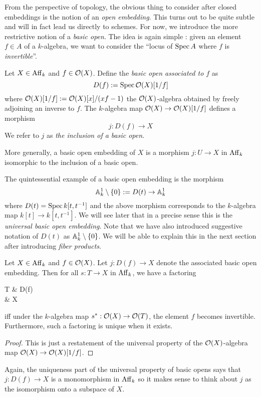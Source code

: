 \documentclass[./main.tex]{subfiles}
\begin{document}
From the perspective of topology,
the obvious thing to consider after closed embeddings
is the notion of an \emph{open embedding}.
This turns out to be quite subtle and
will in fact lead us directly to schemes.
For now, we introduce the more restrictive notion
of a \emph{basic open}.
The idea is again simple : 
given an element $f \in A$ of a $k$-algebra,
we want to consider the ``locus of $\operatorname{Spec} A$ where $f$ is \emph{invertible}''.

\begin{dfn}
  
  Let $X \in \mathrm{Aff}_k$ and $f \in \mathcal{O}(X)$.
  Define the \emph{basic open associated to $f$}
  as \[
    D(f) := \operatorname{Spec} \mathcal{O}(X)[1 / f]
  \] where
  $\mathcal{O}(X)[1 / f] := \mathcal{O}(X)[x] / (x f - 1)$
  the $\mathcal{O}(X)$-algebra obtained by freely adjoining an inverse to $f$.
  The $k$-algebra map $\mathcal{O}(X) \to \mathcal{O}(X)[1 / f]$ defines
  a morphism \[
    j :  D(f) \to X
  \]
  We refer to $j$ as \emph{the inclusion of a basic open}.

  More generally,
  a basic open embedding of $X$ is 
  a morphism $j : U \to X$ in $\mathrm{Aff}_k$ 
  isomorphic to the inclusion of a basic open.
\end{dfn}

\begin{eg}
  The quintessential example of a basic open embedding
  is the morphism \[
    \mathbb{A}^1_k \setminus \left\{0\right\} := D(t) \to \mathbb{A}^1_k  
  \]
  where $D(t) = \operatorname{Spec} k[t , t^{-1}]$ and the
  above morphism corresponds to the
  $k$-algebra map $k[t] \to k[t , t^{-1}]$.
  We will see later that in a precise sense
  this is the \emph{universal basic open embedding}.
  Note that we have also introduced
  suggestive notation of $D(t)$ as
  $\mathbb{A}^1_k \setminus\left\{0\right\}$.
  We will be able to explain this
  in the next section after introducing \emph{fiber products}.
\end{eg}

\begin{prop}
  
  Let $X \in \mathrm{Aff}_k$ and $f \in \mathcal{O}(X)$.
  Let $j : D(f) \to X$ denote the associated basic open embedding.
  Then for all $s : T \to X$ in $\mathrm{Aff}_k$,
  we have a factoring \begin{cd}
    T & D(f) \\
    & X
    \arrow[from = 1-1 , to = 1-2 , dashed]
    \arrow[from = 1-1 , to = 2-2 , "{s}"']
    \arrow[from = 1-2 , to = 2-2, "{j}"]
  \end{cd}
  iff under the $k$-algebra map $s^* : \mathcal{O}(X) \to \mathcal{O}(T)$,
  the element $f$ becomes invertible.
  Furthermore, such a factoring is unique when it exists.
\end{prop}
\begin{proof}
  This is just a restatement of
  the universal property of the $\mathcal{O}(X)$-algebra map 
  $\mathcal{O}(X) \to \mathcal{O}(X)[1 / f]$.
\end{proof}

Again, the uniqueness part of the universal property
of basic opens says that $j : D(f) \to X$ is a monomorphism in $\mathrm{Aff}_k$
so it makes sense to think about $j$ as
the isomorphism onto a subspace of $X$.
\end{document}
